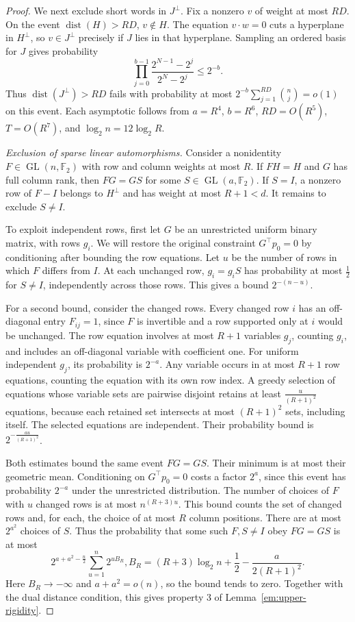 \documentclass[aps,prl,reprint,longbibliography,nofootinbib,nobibnotes]{revtex4-2}
\begin{document}
\begin{proof}
We next exclude short words in $J^\perp$. Fix a nonzero $v$ of weight at most $RD$. On the event
$\operatorname{dist}(H)>RD$, $v\notin H$. The equation $v\cdot w=0$ cuts a hyperplane in $H^\perp$,
so $v\in J^\perp$ precisely if $J$ lies in that hyperplane. Sampling an ordered basis for $J$ gives
probability
\[
 \prod_{j=0}^{b-1}\frac{2^{N-1}-2^j}{2^N-2^j}
 \le 2^{-b}.
\]
Thus $\operatorname{dist}(J^\perp)>RD$ fails with probability at most $2^{-b}\sum_{j=1}^{RD}\binom
nj=o(1)$ on this event. Each asymptotic follows from $a=R^4$, $b=R^6$, $RD=O(R^5)$, $T=O(R^7)$, and
$\log_2 n=12\log_2 R$.

\emph{Exclusion of sparse linear automorphisms.}
Consider a nonidentity $F\in\operatorname{GL}(n,\mathbb F_2)$ with row and column weights at most
$R$. If $FH=H$ and $G$ has full column rank, then $FG=GS$ for some $S\in\operatorname{GL}(a,\mathbb
F_2)$. If $S=I$, a nonzero row of $F-I$ belongs to $H^\perp$ and has weight at most $R+1<d$. It
remains to exclude $S\ne I$.

To exploit independent rows, first let $G$ be an unrestricted uniform binary matrix, with rows
$g_i$. We will restore the original constraint $G^\top p_0=0$ by conditioning after bounding the
row equations. Let $u$ be the number of rows in which $F$ differs from $I$. At each unchanged row,
$g_i=g_iS$ has probability at most $\frac{1}{2}$ for $S\ne I$, independently across those rows.
This gives a bound $2^{-(n-u)}$.

For a second bound, consider the changed rows. Every changed row $i$ has an off-diagonal entry
$F_{ij}=1$, since $F$ is invertible and a row supported only at $i$ would be unchanged. The row
equation involves at most $R+1$ variables $g_j$, counting $g_i$, and includes an off-diagonal
variable with coefficient one. For uniform independent $g_j$, its probability is $2^{-a}$. Any
variable occurs in at most $R+1$ row equations, counting the equation with its own row index. A
greedy selection of equations whose variable sets are pairwise disjoint retains at least
$\frac{u}{(R+1)^2}$ equations, because each retained set intersects at most $(R+1)^2$ sets,
including itself. The selected equations are independent. Their probability bound is
$2^{-\frac{au}{(R+1)^2}}$.

Both estimates bound the same event $FG=GS$. Their minimum is at most their geometric mean.
Conditioning on $G^\top p_0=0$ costs a factor $2^a$, since this event has probability $2^{-a}$
under the unrestricted distribution. The number of choices of $F$ with $u$ changed rows is at most
$n^{(R+3)u}$. This bound counts the set of changed rows and, for each, the choice of at most $R$
column positions. There are at most $2^{a^2}$ choices of $S$. Thus the probability that some such
$F,S\ne I$ obey $FG=GS$ is at most
\begin{equation}\label{em:upper-sparse-linear-count}
 2^{a+a^2-\frac{n}{2}}\sum_{u=1}^{n}2^{uB_R},
 B_R=(R+3)\log_2 n+\frac{1}{2}
             -\frac{a}{2(R+1)^2}.
\end{equation}
Here $B_R\to-\infty$ and $a+a^2=o(n)$, so the bound tends to zero. Together with the dual distance
condition, this gives property 3 of Lemma~\ref{em:upper-rigidity}.


\end{proof}
\end{document}
